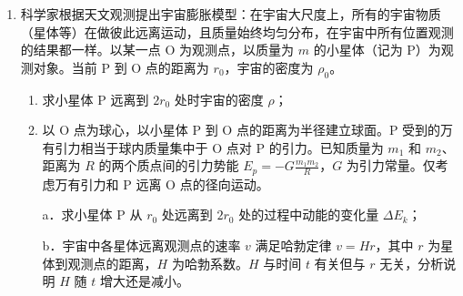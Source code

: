 \documentclass[\gkver]{gaokaozhenti}
\begin{document}
\begin{enumerate}
{解得闭合开关瞬间通过导体棒的电流为 $I = \frac{Q}{CR}$

（2）开关闭合瞬间由牛顿第二定律有 $BIL = ma$

将电流 $I$ 代入解得 $a = \frac{BQL}{CRm}$

（3）由（2）中结论可知，随着电容器放电，所带电荷量不断减少，所以导体棒的加速度不断减小，其 $v-t$ 图线如图所示

}

\item
科学家根据天文观测提出宇宙膨胀模型：在宇宙大尺度上，所有的宇宙物质（星体等）在做彼此远离运动，且质量始终均匀分布，在宇宙中所有位置观测的结果都一样。以某一点 O 为观测点，以质量为 $m$ 的小星体（记为 P）为观测对象。当前 P 到 O 点的距离为 $r_{0}$，宇宙的密度为 $\rho_{0}$。
\begin{enumerate}
	\item
	求小星体 P 远离到 $2r_{0}$ 处时宇宙的密度 $\rho$；
	\item
	以 O 点为球心，以小星体 P 到 O 点的距离为半径建立球面。P 受到的万有引力相当于球内质量集中于 O 点对 P 的引力。已知质量为 $m_{1}$ 和 $m_{2}$、距离为 $R$ 的两个质点间的引力势能 $E_{p} = -G\frac{m_{1}m_{2}}{R}$，$G$ 为引力常量。仅考虑万有引力和 P 远离 O 点的径向运动。

	a．求小星体 P 从 $r_{0}$ 处远离到 $2r_{0}$ 处的过程中动能的变化量 $\Delta E_{k}$；

	b．宇宙中各星体远离观测点的速率 $v$ 满足哈勃定律 $v = Hr$，其中 $r$ 为星体到观测点的距离，$H$ 为哈勃系数。$H$ 与时间 $t$ 有关但与 $r$ 无关，分析说明 $H$ 随 $t$ 增大还是减小。
\end{enumerate}
\end{enumerate}
\end{document}
